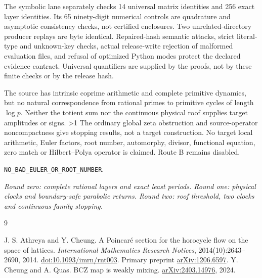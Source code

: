 \documentclass[10pt]{article}
\begin{document}
The symbolic lane separately checks 14 universal matrix identities and
256 exact layer identities. Its 65 ninety-digit numerical controls are
quadrature and asymptotic consistency checks, not certified enclosures.
Two unrelated-directory producer replays are byte identical.
Repaired-hash semantic attacks, strict literal-type and unknown-key
checks, actual release-write rejection of malformed evaluation files,
and refusal of optimized Python modes protect the declared evidence
contract. Universal quantifiers are supplied by the proofs, not by these
finite checks or by the release hash.

\begin{samepage}
The source has intrinsic coprime arithmetic and complete primitive
dynamics, but no natural correspondence from rational primes to
primitive cycles of length $\log p$. Neither the totient sum nor the
continuous physical roof supplies target amplitudes or signs.
\ifnum\CRevisionRound>1
The ordinary global zeta obstruction and source-operator noncompactness
give stopping results, not a target construction.
\fi
No target local arithmetic, Euler factors, root number, automorphy,
divisor, functional equation, zero match or Hilbert--Polya operator is
claimed. Route B remains disabled.
\end{samepage}

\medskip\noindent\texttt{NO\_BAD\_EULER\_OR\_ROOT\_NUMBER}.
\par\smallskip
\noindent\textit{\ifcase\CRevisionRound
Round zero: complete rational layers and exact least periods.
\or
Round one: physical clocks and boundary-safe parabolic returns.
\else
Round two: roof threshold, two clocks and continuous-family stopping.
\fi}
\begin{thebibliography}{9}
\raggedright
{}
J. S. Athreya and Y. Cheung.
A Poincar\'e section for the horocycle flow on the space of lattices.
\emph{International Mathematics Research Notices}, 2014(10):2643--2690, 2014.
\href{https://doi.org/10.1093/imrn/rnt003}{doi:10.1093/imrn/rnt003}.
Primary preprint \href{https://arxiv.org/abs/1206.6597}{arXiv:1206.6597}.
Y. Cheung and A. Quas.
BCZ map is weakly mixing.
\href{https://arxiv.org/abs/2403.14976}{arXiv:2403.14976}, 2024.
\end{thebibliography}
\end{document}
